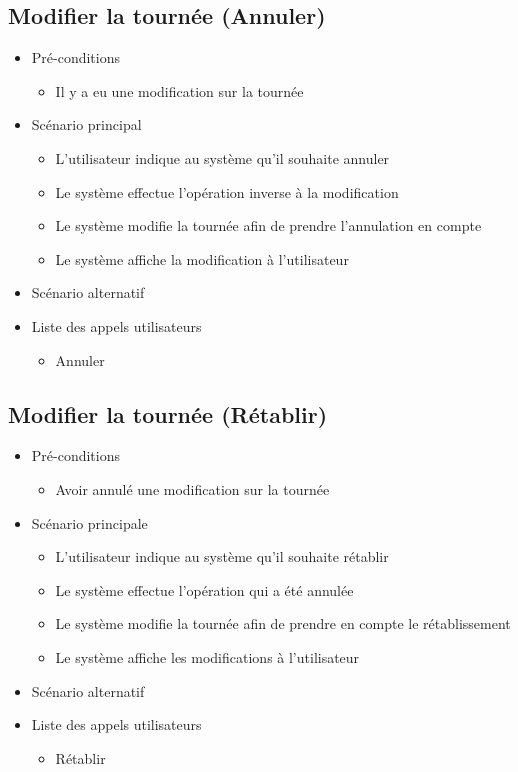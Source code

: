 \documentclass[10pt,a4paper]{book}
\begin{document}
\subsection{Modifier la tournée (Annuler)}
\begin{itemize}
	\item{Pré-conditions}
		\begin{itemize}
		\item{Il y a eu une modification sur la tournée}
	\end{itemize}
	\item{Scénario principal}
	\begin{itemize}
		\item{L’utilisateur indique au système qu’il souhaite annuler}
		\item{Le système effectue l’opération inverse à la modification}
		\item{Le système modifie la tournée afin de prendre l’annulation en compte}
		\item{Le système affiche la modification à l’utilisateur}
	\end{itemize}
	\item{Scénario alternatif}
	\item{Liste des appels utilisateurs}
	\begin{itemize}
		\item{Annuler}
	\end{itemize}
\end{itemize}
\subsection{Modifier la tournée (Rétablir)}
\begin{itemize}
	\item{Pré-conditions}
		\begin{itemize}
		\item{Avoir annulé une modification sur la tournée}
	\end{itemize}
	\item{Scénario principale}
	\begin{itemize}
		\item{L’utilisateur indique au système qu’il souhaite rétablir}
		\item{Le système effectue l’opération qui a été annulée}
		\item{Le système modifie la tournée afin de prendre en compte le rétablissement}
		\item{Le système affiche les modifications à l’utilisateur}
	\end{itemize}
	\item{Scénario alternatif}
	\item{Liste des appels utilisateurs}
	\begin{itemize}
		\item{Rétablir}
	\end{itemize}
\end{itemize}
\end{document}
